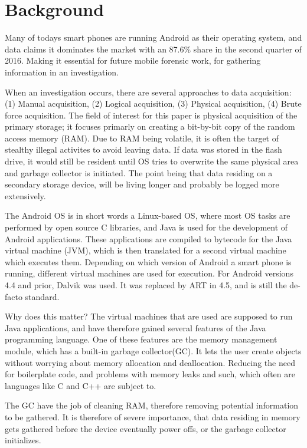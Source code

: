 \section{Background}
Many of todays smart phones are running Android as their operating system, and  data claims it dominates the market with an 87.6\% share in the second quarter of 2016\cite{idc}. Making it essential for future mobile forensic work, for gathering information in an investigation.

When an investigation occurs, there are several approaches to data acquisition: (1) Manual acquisition, (2) Logical acquisition, (3) Physical acquisition, (4) Brute force acquisition. The field of interest for this paper is physical acquisition of the primary storage; it focuses primarly on creating a bit-by-bit copy of the random access memory (RAM). Due to RAM being volatile, it is often the target of stealthy illegal activites to avoid leaving data. If data was stored in the flash drive, it would still be resident until OS tries to overwrite the same physical area and garbage collector is initiated. The point being that data residing on a secondary storage device, will be living longer and probably be logged more extensively.

The Android OS is in short words a Linux-based OS, where most OS tasks are performed by open source C libraries, and Java is used for the development of Android applications. These applications are compiled to bytecode for the Java virtual machine (JVM), which is then translated for a second virtual machine which executes them. Depending on which version of Android a smart phone is running, different virtual machines are used for execution.
For Android versions 4.4 and prior, Dalvik was used. It was replaced by ART in 4.5, and is still the de-facto standard.

Why does this matter? The virtual machines that are used are supposed to run Java applications, and have therefore gained several features of the Java programming language. One of these features are the memory management module, which has a built-in garbage collector(GC). It lets the user create objects without worrying about memory allocation and deallocation. Reducing the need for boilerplate code, and problems with memory leaks and such, which often are languages like C and C++ are subject to. 

The GC have the job of cleaning RAM, therefore removing potential information to be gathered. It is therefore of severe importance, that data residing in memory gets gathered before the device eventually power offs, or the garbage collector initializes.

